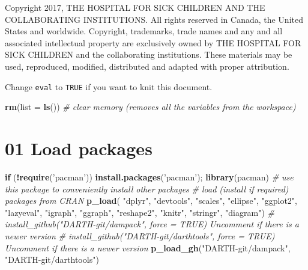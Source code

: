 \documentclass[]{article}
\newenvironment{Shaded}{\begin{snugshade}}{\end{snugshade}}
\newcommand{\KeywordTok}[1]{\textcolor[rgb]{0.13,0.29,0.53}{\textbf{#1}}}
\newcommand{\DataTypeTok}[1]{\textcolor[rgb]{0.13,0.29,0.53}{#1}}
\newcommand{\StringTok}[1]{\textcolor[rgb]{0.31,0.60,0.02}{#1}}
\newcommand{\CommentTok}[1]{\textcolor[rgb]{0.56,0.35,0.01}{\textit{#1}}}
\newcommand{\ControlFlowTok}[1]{\textcolor[rgb]{0.13,0.29,0.53}{\textbf{#1}}}
\newcommand{\OperatorTok}[1]{\textcolor[rgb]{0.81,0.36,0.00}{\textbf{#1}}}
\newcommand{\NormalTok}[1]{#1}
\begin{document}
Copyright 2017, THE HOSPITAL FOR SICK CHILDREN AND THE COLLABORATING
INSTITUTIONS. All rights reserved in Canada, the United States and
worldwide. Copyright, trademarks, trade names and any and all associated
intellectual property are exclusively owned by THE HOSPITAL FOR SICK
CHILDREN and the collaborating institutions. These materials may be
used, reproduced, modified, distributed and adapted with proper
attribution.

\newpage

Change \texttt{eval} to \texttt{TRUE} if you want to knit this document.

\begin{Shaded}
\begin{Highlighting}[]
\KeywordTok{rm}\NormalTok{(}\DataTypeTok{list =} \KeywordTok{ls}\NormalTok{())      }\CommentTok{# clear memory (removes all the variables from the workspace)}
\end{Highlighting}
\end{Shaded}

\section{01 Load packages}\label{load-packages}

\begin{Shaded}
\begin{Highlighting}[]
\ControlFlowTok{if}\NormalTok{ (}\OperatorTok{!}\KeywordTok{require}\NormalTok{(}\StringTok{'pacman'}\NormalTok{)) }\KeywordTok{install.packages}\NormalTok{(}\StringTok{'pacman'}\NormalTok{); }\KeywordTok{library}\NormalTok{(pacman) }\CommentTok{# use this package to conveniently install other packages}
\CommentTok{# load (install if required) packages from CRAN}
\KeywordTok{p_load}\NormalTok{( }\StringTok{"dplyr"}\NormalTok{, }\StringTok{"devtools"}\NormalTok{, }\StringTok{"scales"}\NormalTok{, }\StringTok{"ellipse"}\NormalTok{, }\StringTok{"ggplot2"}\NormalTok{, }\StringTok{"lazyeval"}\NormalTok{, }\StringTok{"igraph"}\NormalTok{, }\StringTok{"ggraph"}\NormalTok{, }\StringTok{"reshape2"}\NormalTok{, }\StringTok{"knitr"}\NormalTok{, }\StringTok{"stringr"}\NormalTok{, }\StringTok{"diagram"}\NormalTok{)   }
\CommentTok{# install_github("DARTH-git/dampack", force = TRUE) Uncomment if there is a newer version}
\CommentTok{# install_github("DARTH-git/darthtools", force = TRUE) Uncomment if there is a newer version}
\KeywordTok{p_load_gh}\NormalTok{(}\StringTok{"DARTH-git/dampack"}\NormalTok{, }\StringTok{"DARTH-git/darthtools"}\NormalTok{)}
\end{Highlighting}
\end{Shaded}
\end{document}
